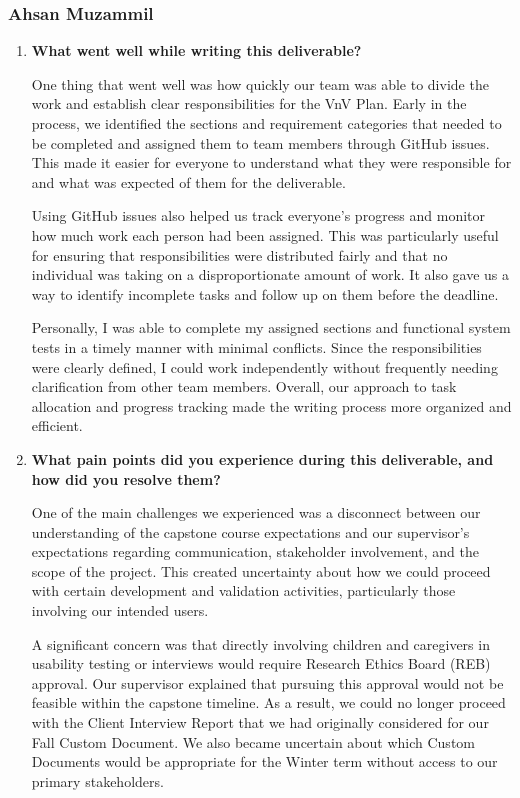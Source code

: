 \documentclass[10pt,titlepage]{article}
\begin{document}
\subsubsection*{Ahsan Muzammil}

\begin{enumerate}

    \item \textbf{What went well while writing this deliverable?}

    One thing that went well was how quickly our team was able to divide
    the work and establish clear responsibilities for the VnV Plan.
    Early in the process, we identified the sections and requirement
    categories that needed to be completed and assigned them to team
    members through GitHub issues. This made it easier for everyone to
    understand what they were responsible for and what was expected
    of them for the deliverable.

    Using GitHub issues also helped us track everyone's progress and
    monitor how much work each person had been assigned. This was
    particularly useful for ensuring that responsibilities were
    distributed fairly and that no individual was taking on a
    disproportionate amount of work. It also gave us a way to
    identify incomplete tasks and follow up on them before the
    deadline.

    Personally, I was able to complete my assigned sections and
    functional system tests in a timely manner with minimal
    conflicts. Since the responsibilities were clearly defined,
    I could work independently without frequently needing
    clarification from other team members. Overall, our approach
    to task allocation and progress tracking made the writing
    process more organized and efficient.


    \item \textbf{What pain points did you experience during this
    deliverable, and how did you resolve them?}

    One of the main challenges we experienced was a disconnect
    between our understanding of the capstone course expectations
    and our supervisor's expectations regarding communication,
    stakeholder involvement, and the scope of the project.
    This created uncertainty about how we could proceed with
    certain development and validation activities, particularly
    those involving our intended users.

    A significant concern was that directly involving children
    and caregivers in usability testing or interviews would
    require Research Ethics Board (REB) approval. Our supervisor
    explained that pursuing this approval would not be feasible
    within the capstone timeline. As a result, we could no
    longer proceed with the Client Interview Report that we
    had originally considered for our Fall Custom Document.
    We also became uncertain about which Custom Documents
    would be appropriate for the Winter term without access
    to our primary stakeholders.


\end{enumerate}
\end{document}
